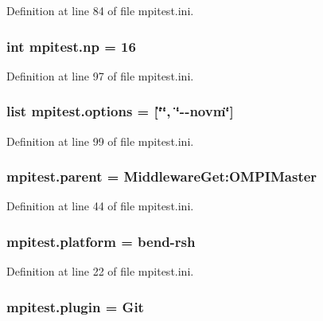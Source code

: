 Definition at line 84 of file mpitest.\-ini.

\hypertarget{namespacempitest_ae35dc1081e40dfe24adccbc698417a69}{
\subsubsection[{np}]{\setlength{\rightskip}{0pt plus 5cm}int mpitest.\-np = 16}}\label{namespacempitest_ae35dc1081e40dfe24adccbc698417a69}


Definition at line 97 of file mpitest.\-ini.

\hypertarget{namespacempitest_a91cdfabf3b22da570c284023ab54044f}{
\subsubsection[{options}]{\setlength{\rightskip}{0pt plus 5cm}list mpitest.\-options = \mbox{[}\char`\"{}\char`\"{}, \char`\"{}-\/-\/novm\char`\"{}\mbox{]}}}\label{namespacempitest_a91cdfabf3b22da570c284023ab54044f}


Definition at line 99 of file mpitest.\-ini.

\hypertarget{namespacempitest_afea79525dcdc90bf190e1fd794ba7377}{
\subsubsection[{parent}]{\setlength{\rightskip}{0pt plus 5cm}mpitest.\-parent = Middleware\-Get\-:\-O\-M\-P\-I\-Master}}\label{namespacempitest_afea79525dcdc90bf190e1fd794ba7377}


Definition at line 44 of file mpitest.\-ini.

\hypertarget{namespacempitest_aa707f637f52c6a7d6e9269de9fa926d3}{
\subsubsection[{platform}]{\setlength{\rightskip}{0pt plus 5cm}mpitest.\-platform = bend-\/rsh}}\label{namespacempitest_aa707f637f52c6a7d6e9269de9fa926d3}


Definition at line 22 of file mpitest.\-ini.

\hypertarget{namespacempitest_ad3586f81f11a42b438f3a012d4c2bf4e}{
\subsubsection[{plugin}]{\setlength{\rightskip}{0pt plus 5cm}mpitest.\-plugin = Git}}\label{namespacempitest_ad3586f81f11a42b438f3a012d4c2bf4e}


